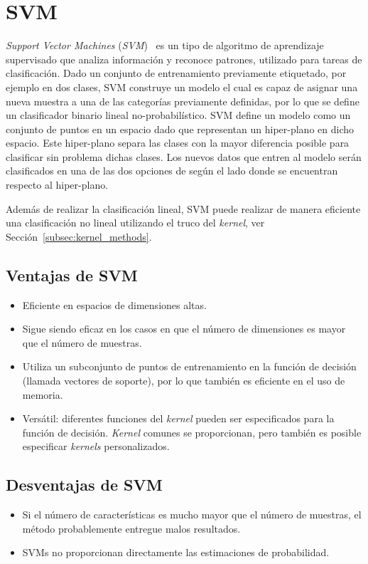 \section{SVM}\label{sec:lsvm}

\textit{Support Vector Machines} (\textit{SVM})~\cite{Vapnik1995, Duda2000, Cortes1995} es un tipo de algoritmo de aprendizaje supervisado que analiza información y reconoce patrones, utilizado para tareas de clasificación. Dado un conjunto de entrenamiento previamente etiquetado, por ejemplo en dos clases, SVM construye un modelo el cual es capaz de asignar una nueva muestra a una de las categorías previamente definidas, por lo que se define un clasificador binario lineal no-probabilístico.
SVM define un modelo como un conjunto de puntos en un espacio dado que representan un hiper-plano en dicho espacio. Este hiper-plano separa las clases con la mayor diferencia posible para clasificar sin problema dichas clases. Los nuevos datos que entren al modelo serán clasificados en una de las dos opciones de según el lado donde se encuentran respecto al hiper-plano.

Además de realizar la clasificación lineal, SVM puede realizar de manera eficiente una clasificación no lineal utilizando el truco del \textit{kernel}, ver Sección~\ref{subsec:kernel_methods}.%

\subsection{Ventajas de SVM}
\begin{itemize}
\item Eficiente en espacios de dimensiones altas.
\item Sigue siendo eficaz en los casos en que el número de dimensiones es mayor que el número de muestras.
\item Utiliza un subconjunto de puntos de entrenamiento en la función de decisión (llamada vectores de soporte), por lo que también es eficiente en el uso de memoria.
\item Versátil: diferentes funciones del \textit{kernel} pueden ser especificados para la función de decisión. \textit{Kernel} comunes se proporcionan, pero también es posible especificar \textit{kernels} personalizados.
\end{itemize}

\subsection{Desventajas de SVM}
\begin{itemize}
\item Si el número de características es mucho mayor que el número de muestras, el método probablemente entregue malos resultados.
\item SVMs no proporcionan directamente las estimaciones de probabilidad.
\end{itemize}

